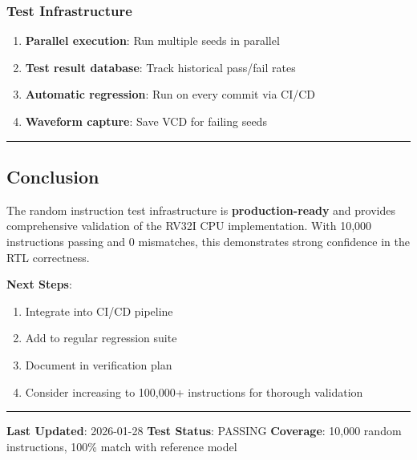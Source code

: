 \subsubsection{Test Infrastructure}\label{cr:status:random-tests-status:test-infrastructure}

\begin{record}

\begin{enumerate}
\def\labelenumi{\arabic{enumi}.}
\tightlist
\item
  \textbf{Parallel execution}: Run multiple seeds in parallel
\item
  \textbf{Test result database}: Track historical pass/fail rates
\item
  \textbf{Automatic regression}: Run on every commit via CI/CD
\item
  \textbf{Waveform capture}: Save VCD for failing seeds
\end{enumerate}

\begin{center}\rule{0.5\linewidth}{0.5pt}\end{center}

\end{record}

\subsection{Conclusion}\label{cr:status:random-tests-status:conclusion}

\begin{record}

The random instruction test infrastructure is \textbf{production-ready}
and provides comprehensive validation of the RV32I CPU implementation.
With 10,000 instructions passing and 0 mismatches, this demonstrates
strong confidence in the RTL correctness.

\textbf{Next Steps}:

\begin{enumerate}
\def\labelenumi{\arabic{enumi}.}
\tightlist
\item
  \ok{} Integrate into CI/CD pipeline
\item
  \ok{} Add to regular regression suite
\item
  \ok{} Document in verification plan
\item
  Consider increasing to 100,000+ instructions for thorough validation
\end{enumerate}

\begin{center}\rule{0.5\linewidth}{0.5pt}\end{center}

\textbf{Last Updated}: 2026-01-28 \textbf{Test Status}: \ok{} PASSING
\textbf{Coverage}: 10,000 random instructions, 100\% match with
reference model

\end{record}

